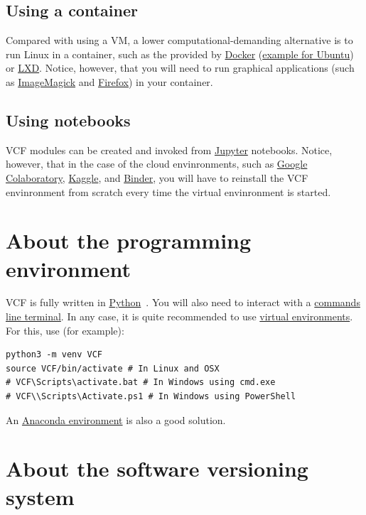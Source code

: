 \subsection{Using a container}
Compared with using a VM, a lower computational-demanding alternative
is to run Linux in a container, such as the provided by
\href{https://hub.docker.com/}{Docker}
(\href{https://hub.docker.com/_/ubuntu}{example for Ubuntu}) or
\href{https://linuxcontainers.org/}{LXD}. Notice, however, that you
will need to run graphical applications (such as
\href{https://linuxcontainers.org/}{ImageMagick} and
\href{https://www.mozilla.org/firefox}{Firefox}) in your container.

\subsection{Using notebooks}
VCF modules can be created and invoked from
\href{https://jupyter.org/}{Jupyter} notebooks. Notice, however, that
in the case of the cloud envinronments, such as
\href{https://colab.research.google.com/}{Google Colaboratory},
\href{https://www.kaggle.com/}{Kaggle}, and
\href{https://mybinder.org/}{Binder}, you will have to reinstall the
VCF envinronment from scratch every time the virtual envinronment is
started.

\section{About the programming environment}
VCF is fully written in
\href{https://www.python.org/}{Python}~\cite{vruiz__YAPT}. You will
also need to interact with a
\href{https://en.wikipedia.org/wiki/Command-line_interface}{commands
  line terminal}. In any case, it is quite recommended to use
\href{https://docs.python.org/3/library/venv.html}{virtual
  environments}. For this, use (for example):
\begin{verbatim}
python3 -m venv VCF
source VCF/bin/activate # In Linux and OSX
# VCF\Scripts\activate.bat # In Windows using cmd.exe
# VCF\\Scripts\Activate.ps1 # In Windows using PowerShell
\end{verbatim}

An
\href{https://www.anaconda.com/docs/getting-started/working-with-conda/environments}{Anaconda
  environment} is also a good solution.

\section{About the software versioning system}

